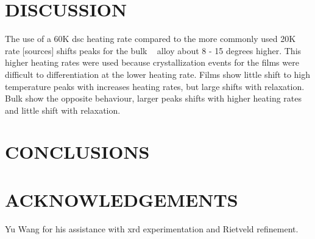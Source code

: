 \documentclass[a4paper,12pt,oneside]{article}%
\begin{document}

\section{DISCUSSION}

The use of a 60K \gls{dsc} heating rate compared to the more commonly used 20K rate [sources] shifts peaks for the bulk \MgZnCa~ alloy about 8 - 15 degrees higher. This higher heating rates were used because crystallization events for the films were difficult to differentiation at the lower heating rate. 
Films show little shift to high temperature peaks with increases heating rates, but large shifts with relaxation. 
Bulk show the opposite behaviour, larger peaks shifts with higher heating rates and little shift with relaxation.


\section{CONCLUSIONS}


\section{ACKNOWLEDGEMENTS}

Yu Wang for his assistance with \acrshort{xrd} experimentation and Rietveld refinement. 





\end{document}

